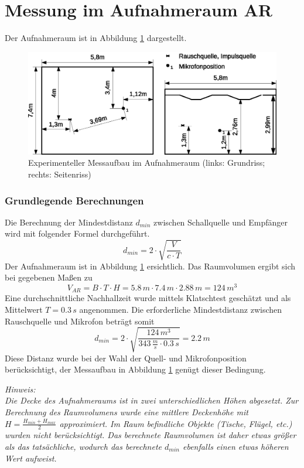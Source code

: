 \documentclass[11pt]{report}
\begin{document}
\section{Messung im Aufnahmeraum AR}
Der Aufnahmeraum ist in Abbildung \ref{fig:ARgeometrics} dargestellt. 
\begin{figure}[htbp]
\begin{center}
\includegraphics[width=14cm,keepaspectratio=true]{AR}
\caption{Experimenteller Messaufbau im Aufnahmeraum (links: Grundriss; rechts: Seitenriss)}
\label{fig:ARgeometrics}
\end{center}
\end{figure}
\subsubsection{Grundlegende Berechnungen}
Die Berechnung der Mindestdistanz $d_{min}$ zwischen Schallquelle und Empf\"anger wird mit folgender Formel durchgef\"uhrt.
\begin{equation}
d_{min}=2\cdot \sqrt{\frac{V}{c\cdot T}}
\label{eq:dmin}
\end{equation}
Der Aufnahmeraum ist in Abbildung \ref{fig:ARgeometrics} ersichtlich. Das Raumvolumen ergibt sich bei gegebenen Ma\ss en zu 
\begin{equation}
V_{AR} = B\cdot T\cdot H = 5.8\,m\cdot 7.4\,m\cdot 2.88\,m = 124\,m^{3}
\end{equation}
Eine durchschnittliche Nachhallzeit wurde mittels Klatschtest gesch\"atzt und als Mittelwert $T=0.3\,s$ angenommen. Die erforderliche Mindestdistanz zwischen Rauschquelle und Mikrofon betr\"agt somit
\begin{equation}
d_{min}=2\cdot \sqrt{\frac{124\,m^{3}}{343\,\frac{m}{s}\cdot 0.3\,s}} = 2.2\,m
\end{equation}
Diese Distanz wurde bei der Wahl der Quell- und Mikrofonposition ber\"ucksichtigt, der Messaufbau in Abbildung \ref{fig:ARgeometrics} gen\"ugt dieser Bedingung.
\begin{leftbar}
\textit{ Hinweis:\\
Die Decke des Aufnahmeraums ist in zwei unterschiedlichen H\"ohen abgesetzt. Zur Berechnung des Raumvolumens wurde eine mittlere Deckenh\"ohe mit $H=\frac{H_{min}+H_{max}}{2}$ approximiert. Im Raum befindliche Objekte (Tische, Fl\"ugel, etc.) wurden nicht ber\"ucksichtigt. Das berechnete Raumvolumen ist daher etwas gr\"o\ss er als das tats\"achliche, wodurch das berechnete $d_{min}$ ebenfalls einen etwas h\"oheren Wert aufweist.} 
\end{leftbar}
\end{document}
